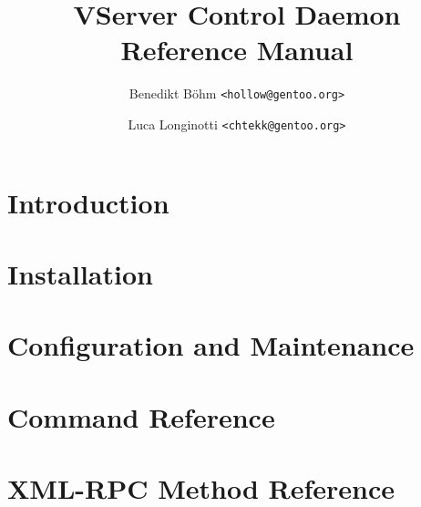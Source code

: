 \documentclass[10pt,oneside,halfparskip]{scrbook}
\title{VServer Control Daemon\\Reference Manual}
\author{Benedikt Böhm \texttt{<hollow@gentoo.org>} \and
Luca Longinotti \texttt{<chtekk@gentoo.org>}}
\begin{document}
\maketitle

\frontmatter
\pagestyle{plain}
\setcounter{tocdepth}{1}
\tableofcontents


\mainmatter
\renewcommand*{\partpagestyle}{empty}
\renewcommand*{\chapterpagestyle}{vcdmanual}
\pagestyle{vcdmanual}

\part{Introduction}
\label{pt:intro}




\part{Installation}
\label{pt:install}

\part{Configuration and Maintenance}
\label{pt:config}

\part{Command Reference}
\label{pt:cmdref}






\part{XML-RPC Method Reference}
\label{pt:rpcref}







\backmatter

\end{document}
